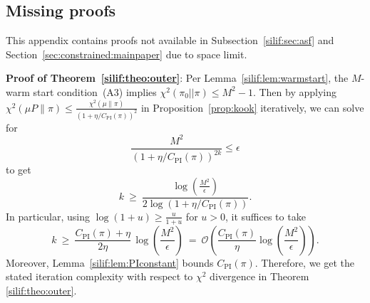 \documentclass[11pt,letterpaper]{article}
\newcommand{\brac}[1]{\left( #1\right)}
\begin{document}



\subsection{Missing proofs}
\label{silif:appen:missingproofs}
This appendix contains  proofs not available in Subsection~\ref{silif:sec:asf} and Section~\ref{sec:constrained:mainpaper} due to space limit. 


\medskip
   \textbf{Proof of Theorem~\ref{silif:theo:outer}}:
  Per Lemma~\ref{silif:lem:warmstart}, the $M$-warm start condition~(A3) implies $\chi^2\brac{\pi_0||\pi}\leq M^2-1$. Then by applying $\chi^2(\mu P\|\pi)\le \frac{\chi^2(\mu\|\pi)}{(1+\eta/C_{\mathrm{PI}}(\pi))^2}$ in Proposition~\ref{prop:kook} iteratively,  we can solve for 
\[
        \frac{M^2}{\brac{1+\eta/C_{\mathrm{PI}}(\pi)}^{2k}} \leq \epsilon
\]
to get 
\[
k \ \ge\  \frac{\log\!\left(\frac{M^2}{\epsilon}\right)}{2\log\!\left(1+\eta/C_{\mathrm{PI}}(\pi)\right)}.
\]
In particular, using $\log(1+u)\ge \frac{u}{1+u}$ for $u>0$, it suffices to take
\[
k \ \ge\ \frac{C_{\mathrm{PI}}(\pi)+\eta}{2\eta}\,\log\!\left(\frac{M^2}{\epsilon}\right)
\ =\ \mathcal{O}\!\left(\frac{C_{\mathrm{PI}}(\pi)}{\eta}\log\!\left(\frac{M^2}{\epsilon}\right)\right).
\]
Moreover, Lemma~\ref{silif:lem:PIconstant} bounds $C_{\mathrm{PI}}(\pi)$. Therefore, we get the stated iteration complexity with respect to $\chi^2$ divergence in Theorem \ref{silif:theo:outer}. 
\end{document}

